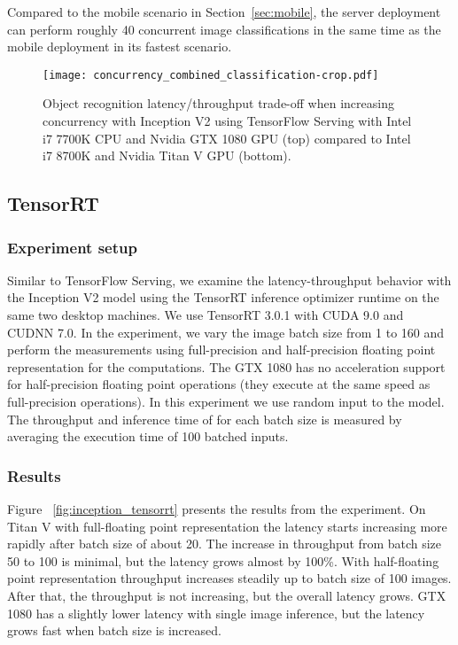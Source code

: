 \documentclass[sigconf]{acmart}
\begin{document}
Compared to the mobile scenario in Section~\ref{sec:mobile}, the server deployment can perform roughly 40 concurrent image classifications in the same time as the mobile deployment in its fastest scenario.

\begin{figure}[t]
\centering
\texttt{[image: concurrency\_combined\_classification-crop.pdf]}
\caption{Object recognition latency/throughput trade-off when increasing concurrency with Inception V2 using TensorFlow Serving with Intel i7 7700K CPU and Nvidia GTX 1080 GPU (top) compared to Intel i7 8700K and Nvidia Titan V GPU (bottom).}
\label{fig:concurrency_combined_class}
\end{figure}\subsection{TensorRT}\subsubsection{Experiment setup}
Similar to TensorFlow Serving, we examine the latency-throughput behavior with the Inception V2 model using the TensorRT inference optimizer runtime on the same two desktop machines. We use TensorRT 3.0.1 with CUDA 9.0 and CUDNN 7.0. In the experiment, we vary the image batch size from 1 to 160 and perform the measurements using full-precision and half-precision floating point representation for the computations. The GTX 1080 has no acceleration support for half-precision floating point operations (they execute at the same speed as full-precision operations). In this experiment we use random input to the model. The throughput and inference time of for each batch size is measured by averaging the execution time of 100 batched inputs.

\subsubsection{Results}
Figure ~\ref{fig:inception_tensorrt} presents the results from the experiment. On Titan V with full-floating point representation the latency starts increasing more rapidly after batch size of about 20. The increase in throughput from batch size 50 to 100 is minimal, but the latency grows almost by 100\%. With half-floating point representation throughput increases steadily up to batch size of 100 images. After that, the throughput is not increasing, but the overall latency grows. GTX 1080 has a slightly lower latency with single image inference, but the latency grows fast when batch size is increased.
\end{document}
